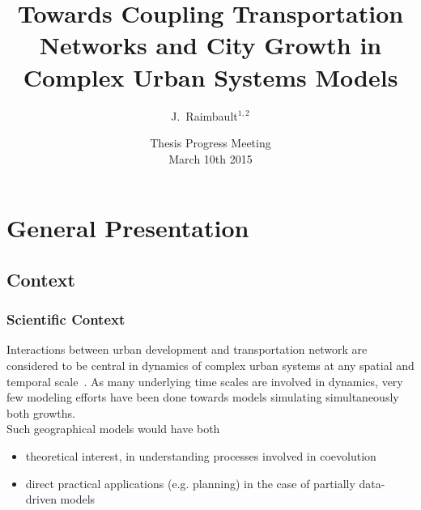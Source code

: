 


\title{Towards Coupling Transportation Networks and City Growth in Complex Urban Systems Models
}


\author{J.~Raimbault$^{1,2}$}



\date{Thesis Progress Meeting\\
March 10th 2015}


\begin{frame}
\titlepage
\end{frame}

\begin{frame}
\tableofcontents
\end{frame}



\section{General Presentation}

\subsection{Context}


\begin{frame}
\frametitle{Scientific Context}
\vfill{}
\begin{justify}
Interactions between urban development and transportation network are considered to be central in dynamics of complex urban systems at any spatial and temporal scale~\cite{bretagnolle:tel-00459720}\cite{offner1993effets}. As many underlying time scales are involved in dynamics, very few modeling efforts have been done towards models simulating simultaneously both growths.\\
\vfill{}
Such geographical models would have both
\begin{itemize}
\item theoretical interest, in understanding processes involved in coevolution
\item direct practical applications (e.g. planning) in the case of partially data-driven models
\end{itemize}
\vfill{}

\vfill{}

\end{justify}
\end{frame}


